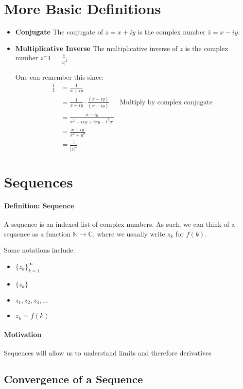 \documentclass[]{article}
\begin{document}
\section{More Basic Definitions}
\begin{itemize}
	\item \textbf{Conjugate} The conjugate of $z = x + iy$ is the complex number $\bar{z} = x - iy$.
	\item \textbf{Multiplicative Inverse} The multiplicative inverse of $z$ is the complex number $z^-1 = \frac{\bar{z}}{|z|^2}$
	
	\bigskip One can remember this since:
	\[\begin{aligned}
	\frac{1}{z}
		&= \frac{1}{x + iy} \\
		&= \frac{1}{x + iy} \cdot \frac{(x - iy)}{(x - iy)} & \text{Multiply by complex conjugate} \\
		&= \frac{x - iy}{x^2 - ixy + ixy - i^2y^2} \\
		&= \frac{x - iy}{x^2 + y^2} \\
		&= \frac{\bar{z}}{|z|^2}
	\end{aligned}\]
\end{itemize}

\section{Sequences}
\paragraph{Definition: Sequence} A sequence is an indexed list of complex numbers. As such, we can think of a sequence as a function $\mathbb{N} \rightarrow \mathbb{C}$, where we usually write $z_k$ for $f(k)$.

Some notations include:
\begin{itemize}
	\item $\{z_k\}^\infty_{k=1}$
	\item $\{z_k\}$
	\item $z_1, z_2, z_3, ...$
	\item $z_k = f(k)$
\end{itemize}

\paragraph{Motivation} Sequences will allow us to understand limits and therefore derivatives

\subsection{Convergence of a Sequence}
\end{document}

